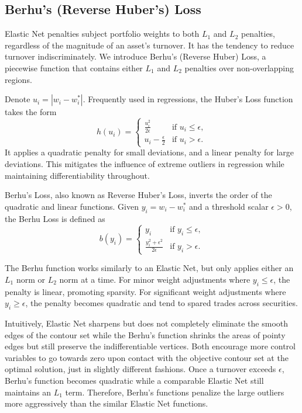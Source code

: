 \documentclass[11pt, letterpaper]{article}
\begin{document}
\subsection{Berhu's (Reverse Huber's) Loss}
Elastic Net penalties subject portfolio weights to both $L_1$ and $L_2$ penalties, regardless of the magnitude of an asset's
turnover. It has the tendency to reduce turnover indiscriminately. We introduce Berhu's (Reverse Huber) Loss, a piecewise function that contains either $L_1$ and $L_2$ penalties over non-overlapping regions.

Denote $u_i = |w_i - w_i^*|$. Frequently used in regressions, the Huber's Loss function takes the form
\begin{equation}
\label{huber_loss}
    h(u_i) = \begin{cases}
        \frac{u_i^2}{2\epsilon} & \text{if } u_i \leq \epsilon, \\
        u_i - \frac{\epsilon}{2} & \text{if } u_i > \epsilon.
    \end{cases}
\end{equation}
It applies a quadratic penalty for small deviations, and a linear penalty for large deviations. This mitigates the influence of
extreme outliers in regression while maintaining differentiability throughout.

Berhu's Loss, also known as Reverse Huber's Loss, inverts the order of the quadratic and linear functions. Given
$y_i = w_i - w_i^*$ and a threshold scalar $\epsilon > 0$, the Berhu Loss is defined as
\begin{equation}
\label{berhu_loss}
    b(y_i) = \begin{cases}
        y_i & \text{if } y_i \leq \epsilon, \\
        \frac{y_i^2 + \epsilon^2}{2\epsilon} & \text{if } y_i > \epsilon.
    \end{cases}
\end{equation}

The Berhu function works similarly to an Elastic Net, but only applies either an $L_1$ norm or $L_2$ norm at a time. For minor
weight adjustments where $y_i \leq \epsilon$, the penalty is linear, promoting sparsity. For significant weight adjustments
where $y_i \geq \epsilon$, the penalty becomes quadratic and tend to spared trades across securities.

Intuitively, Elastic Net sharpens but does not completely eliminate the smooth edges of the contour set while the Berhu's
function shrinks the areas of pointy edges but still preserve the indifferentiable vertices. Both encourage more control
variables to go towards zero upon contact with the objective contour set at the optimal solution, just in slightly different
fashions. Once a turnover exceeds $\epsilon$, Berhu's function becomes quadratic while a comparable Elastic Net still maintains an $L_1$
term. Therefore, Berhu's functions penalize the large outliers more aggressively than the similar Elastic Net functions.
\end{document}
